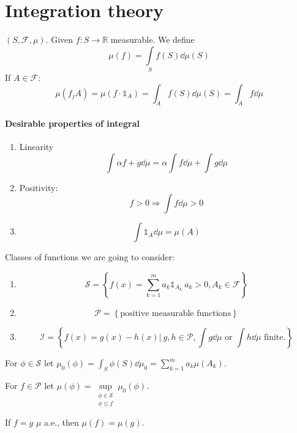 \section{Integration theory}
\begin{definition}[Notation]
	$(S, \mathcal{F}, \mu)$. Given $f: S\to \mathbb{R}$ measurable. We define
	$$\mu(f) = \int\limits_S f(S) \dd{\mu(S)}$$
	If $A\in \mathcal{F}$:
	$$\mu(f_{j}A) =  \mu(f\cdot \mathds{1}_A) = \int_Af(S) \dd{\mu(S)} = \int_A f \dd{\mu} $$
\end{definition}
\paragraph{Desirable properties of integral}
\begin{enumerate}
	\item Linearity $$\int \alpha f + g \dd{\mu} = \alpha \int f \dd{\mu} + \int g \dd{\mu}$$
	\item Positivity: $$f>0 \Rightarrow \int f \dd{\mu}>0$$
	\item $$\int \mathds{1}_A \dd{\mu} = \mu(A)$$
\end{enumerate}

Classes of functions we are going to consider:
\begin{enumerate}
	\item $$\mathcal{S} = \left\{ f(x) = \sum_{k=1}^m a_k \mathds{1}_{A_k} \: a_k>0, A_k \in \mathcal{F} \right\}$$ 
	\item $$\mathcal{P} = \left\{\text{positive measurable functions} \right\}$$ 
	\item $$\mathcal{I} = \left\{ f(x) = g(x)-h(x) | \: g,h\in \mathcal{P}, \int g \dd{\mu}  \text{ or } \int h \dd{\mu}  \text{ finite.} \right\} $$ 
\end{enumerate}

\begin{definition}
	For $\phi \in \mathcal{S}$ let $\mu_0(\phi) = \int_S \phi(S) \dd{\mu_0}  =\sum_{k=1}^m a_k \mu(A_k)$.
\end{definition}

\begin{definition}
For $f \in \mathcal{P}$ let $\mu(\phi) = \sup\limits_{\substack{\phi \in \mathcal{S} \\ \phi\leq f}} \mu_0(\phi)$.
\end{definition}

\begin{prop}
	If $f=g$ $\mu$ a.e., then $\mu(f)=\mu(g)$.
\end{prop}

